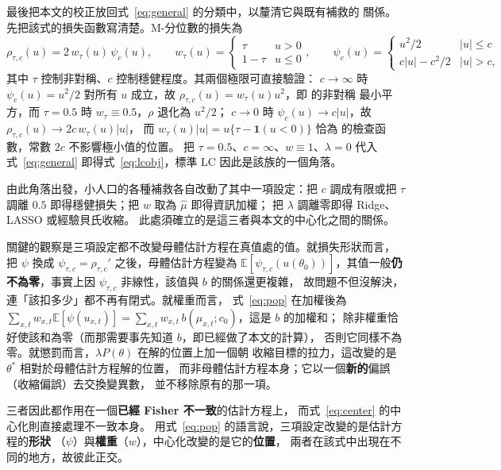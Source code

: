 \documentclass[UTF8, fontset=macnew, a4paper, 12pt]{ctexart}
\newcommand{\Ex}{\mathbb{E}}
\begin{document}
最後把本文的校正放回式~\eqref{eq:general} 的分類中，以釐清它與既有補救的
關係。先把該式的損失函數寫清楚。M-分位數的損失為
\begin{equation}\label{eq:mq}
\rho_{\tau,c}(u)=2\,w_\tau(u)\,\psi_c(u),\qquad
w_\tau(u)=\begin{cases}\tau & u>0\\ 1-\tau & u\le 0\end{cases},\qquad
\psi_c(u)=\begin{cases}u^2/2 & |u|\le c\\ c|u|-c^2/2 & |u|>c,\end{cases}
\end{equation}
其中 $\tau$ 控制非對稱、$c$ 控制穩健程度。其兩個極限可直接驗證：
$c\to\infty$ 時 $\psi_c(u)=u^2/2$ 對所有 $u$ 成立，故
$\rho_{\tau,c}(u)=w_\tau(u)u^2$，即 \citet{newey1987}的非對稱
最小平方，而 $\tau=0.5$ 時 $w_\tau\equiv0.5$，$\rho$ 退化為 $u^2/2$；
$c\to0$ 時 $\psi_c(u)\to c|u|$，故 $\rho_{\tau,c}(u)\to 2c\,w_\tau(u)|u|$，
而 $w_\tau(u)|u|=u\{\tau-\mathbf{1}(u<0)\}$ 恰為 \citet{koenker1978}
的檢查函數，常數 $2c$ 不影響極小值的位置。
把 $\tau=0.5$、$c=\infty$、$w\equiv1$、$\lambda=0$ 代入式~\eqref{eq:general}
即得式~\eqref{eq:lcobj}，標準 LC 因此是該族的一個角落。

由此角落出發，小人口的各種補救各自改動了其中一項設定：把 $c$ 調成有限或把
$\tau$ 調離 $0.5$ 即得穩健損失；把 $w$ 取為 $\hat\mu$ 即得資訊加權；
把 $\lambda$ 調離零即得 Ridge、LASSO 或經驗貝氏收縮。
此處須確立的是這三者與本文的中心化之間的關係。

關鍵的觀察是三項設定都不改變母體估計方程在真值處的值。就損失形狀而言，
把 $\psi$ 換成 $\psi_{\tau,c}=\rho_{\tau,c}'$ 之後，母體估計方程變為
$\Ex[\psi_{\tau,c}(u(\theta_0))]$，其值一般\textbf{仍不為零}，事實上因 $\psi_{\tau,c}$ 非線性，該值與 $b$ 的關係還更複雜，
故問題不但沒解決，連「該扣多少」都不再有閉式。就權重而言，
式~\eqref{eq:pop} 在加權後為 $\sum_{x,t}w_{x,t}\Ex[\psi(u_{x,t})]=
\sum_{x,t}w_{x,t}\,b(\mu_{x,t};c_0)$，這是 $b$ 的加權和；
除非權重恰好使該和為零（而那需要事先知道 $b$，即已經做了本文的計算），
否則它同樣不為零。就懲罰而言，$\lambda P(\theta)$ 在解的位置上加一個朝
收縮目標的拉力，這改變的是 $\theta^{\ast}$ 相對於母體估計方程解的位置，
而非母體估計方程本身；它以一個\textbf{新的}偏誤（收縮偏誤）去交換變異數，
並不移除原有的那一項。

三者因此都作用在一個\textbf{已經 Fisher 不一致}的估計方程上，
而式~\eqref{eq:center} 的中心化則直接處理不一致本身。
用式~\eqref{eq:pop} 的語言說，三項設定改變的是估計方程的\textbf{形狀}
（$\psi$）與\textbf{權重}（$w$），中心化改變的是它的\textbf{位置}，
兩者在該式中出現在不同的地方，故彼此正交。
\end{document}
